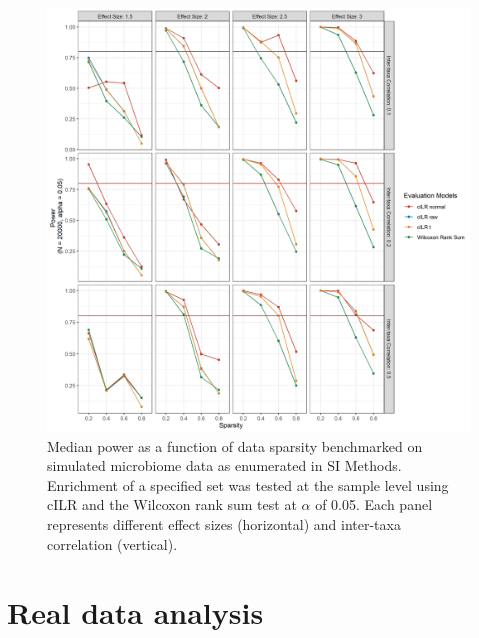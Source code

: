 \documentclass{article}
\begin{document}
\begin{figure}[H]
    \centering
    \includegraphics[scale=0.5]{figures/pwr_single_sample.png}
    \caption{Median power as a function of data sparsity benchmarked on simulated microbiome data as enumerated in SI Methods. Enrichment of a specified set was tested at the sample level using cILR and the Wilcoxon rank sum test at $\alpha$ of 0.05. Each panel represents different effect sizes (horizontal) and inter-taxa correlation (vertical).}
\end{figure}

\section*{Real data analysis} 
\end{document}
